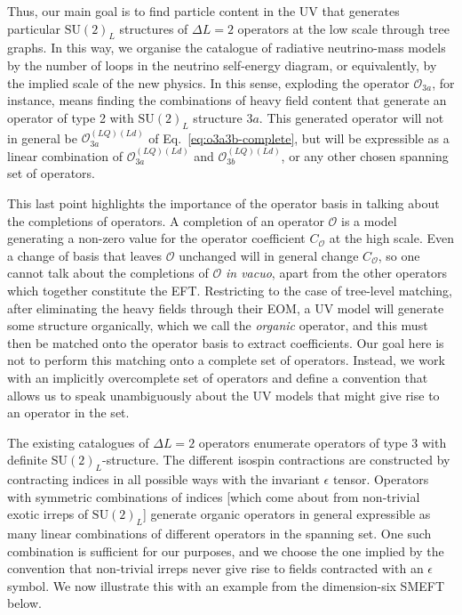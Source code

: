 Thus, our main goal is to find particle content in the UV that generates
particular $\mathrm{SU}(2)_L$ structures of $\Delta L = 2$ operators at the low
scale through tree graphs. In this way, we organise the catalogue of radiative
neutrino-mass models by the number of loops in the neutrino self-energy diagram,
or equivalently, by the implied scale of the new physics. In this sense,
exploding the operator $\mathcal{O}_{3a}$, for instance, means finding the
combinations of heavy field content that generate an operator of type 2 with
$\mathrm{SU}(2)_{L}$ structure $3a$. This generated operator will not in general
be $\mathcal{O}_{3a}^{(LQ)(Ld)}$ of Eq.~\eqref{eq:o3a3b-complete}, but will be
expressible as a linear combination of $\mathcal{O}_{3a}^{(LQ)(Ld)}$ and
$\mathcal{O}_{3b}^{(LQ)(Ld)}$, or any other chosen spanning set of operators.

This last point highlights the importance of the operator basis in talking about
the completions of operators. A completion of an operator $\mathcal{O}$ is a
model generating a non-zero value for the operator coefficient $C_{\mathcal{O}}$
at the high scale. Even a change of basis that leaves $\mathcal{O}$ unchanged
will in general change $C_{\mathcal{O}}$, so one cannot talk about the
completions of $\mathcal{O}$ \textit{in vacuo}, apart from the other operators
which together constitute the EFT. Restricting to the case of tree-level
matching, after eliminating the heavy fields through their EOM, a UV model will
generate some structure organically, which we call the \textit{organic}
operator, and this must then be matched onto the operator basis to extract
coefficients. Our goal here is not to perform this matching onto a complete set
of operators. Instead, we work with an implicitly overcomplete set of operators
and define a convention that allows us to speak unambiguously about the UV
models that might give rise to an operator in the set.

The existing catalogues of $\Delta L = 2$ operators enumerate operators of type
3 with definite $\mathrm{SU}(2)_{L}$-structure. The different isospin
contractions are constructed by contracting indices in all possible ways with
the invariant $\epsilon$ tensor. Operators with symmetric combinations of
indices [which come about from non-trivial exotic irreps of
$\mathrm{SU}(2)_{L}$] generate organic operators in general expressible as many
linear combinations of different operators in the spanning set. One such
combination is sufficient for our purposes, and we choose the one implied by the
convention that non-trivial irreps never give rise to fields contracted with an
$\epsilon$ symbol. We now illustrate this with an example from the dimension-six
SMEFT below.

